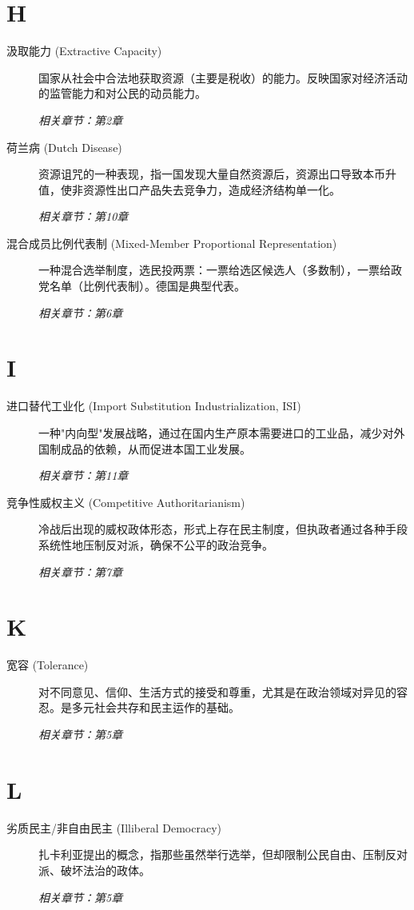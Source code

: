 \section{H}
\begin{description}
    \item[汲取能力 (Extractive Capacity)] 国家从社会中合法地获取资源（主要是税收）的能力。反映国家对经济活动的监管能力和对公民的动员能力。 \par\textit{相关章节：第2章}
    \item[荷兰病 (Dutch Disease)] 资源诅咒的一种表现，指一国发现大量自然资源后，资源出口导致本币升值，使非资源性出口产品失去竞争力，造成经济结构单一化。 \par\textit{相关章节：第10章}
    \item[混合成员比例代表制 (Mixed-Member Proportional Representation)] 一种混合选举制度，选民投两票：一票给选区候选人（多数制），一票给政党名单（比例代表制）。德国是典型代表。 \par\textit{相关章节：第6章}
\end{description}

\section{I}
\begin{description}
    \item[进口替代工业化 (Import Substitution Industrialization, ISI)] 一种"内向型"发展战略，通过在国内生产原本需要进口的工业品，减少对外国制成品的依赖，从而促进本国工业发展。 \par\textit{相关章节：第11章}
    \item[竞争性威权主义 (Competitive Authoritarianism)] 冷战后出现的威权政体形态，形式上存在民主制度，但执政者通过各种手段系统性地压制反对派，确保不公平的政治竞争。 \par\textit{相关章节：第7章}
\end{description}

\section{K}
\begin{description}
    \item[宽容 (Tolerance)] 对不同意见、信仰、生活方式的接受和尊重，尤其是在政治领域对异见的容忍。是多元社会共存和民主运作的基础。 \par\textit{相关章节：第5章}
\end{description}

\section{L}
\begin{description}
    \item[劣质民主/非自由民主 (Illiberal Democracy)] 扎卡利亚提出的概念，指那些虽然举行选举，但却限制公民自由、压制反对派、破坏法治的政体。 \par\textit{相关章节：第5章}
\end{description}

